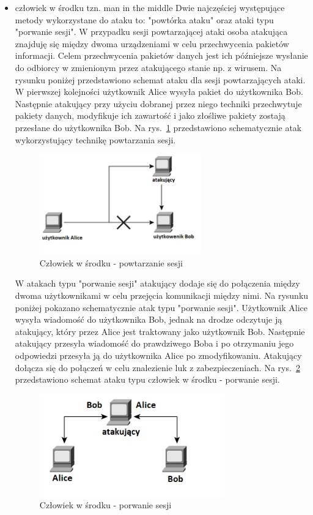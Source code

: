 \documentclass[12p]{article}
\begin{document}
\begin{itemize}
\item człowiek w środku tzn. man in the middle
\newline Dwie najczęściej występujące metody wykorzystane do ataku to: "powtórka ataku" oraz ataki typu "porwanie sesji". W przypadku sesji powtarzającej ataki osoba atakująca znajduję się między dwoma urządzeniami w celu przechwycenia pakietów informacji. Celem przechwycenia pakietów danych jest ich późniejsze wysłanie do odbiorcy w zmienionym przez atakującego stanie np. z wirusem. Na rysunku poniżej przedstawiono schemat ataku dla sesji powtarzających ataki. W pierwszej kolejności użytkownik Alice wysyła pakiet do użytkownika Bob. Następnie atakujący przy użyciu dobranej przez niego techniki przechwytuje pakiety danych, modyfikuje ich zawartość i jako złośliwe pakiety zostają przesłane do użytkownika Bob. Na rys.~\ref{Powtarzajace_ataki} przedstawiono schematycznie atak wykorzystujący technikę powtarzania sesji.
\begin{figure}[H]
\centering
\includegraphics[width=7cm]{Powtarzajace_ataki.jpg}
\caption{Człowiek w środku - powtarzanie sesji}\label{Powtarzajace_ataki}
\end{figure}

\quad W atakach typu "porwanie sesji" atakujący dodaje się do połączenia między dwoma użytkownikami w celu przejęcia komunikacji między nimi. Na rysunku poniżej pokazano schematycznie atak typu "porwanie sesji". Użytkownik Alice wysyła wiadomość do użytkownika Bob, jednak na drodze odczytuje ją atakujący, który przez Alice jest traktowany jako użytkownik Bob. Następnie atakujący przesyła wiadomość do prawdziwego Boba i po otrzymaniu jego odpowiedzi przesyła ją do użytkownika Alice po zmodyfikowaniu. Atakujący dołącza się do połączeń w celu znalezienie luk z zabezpieczeniach. Na rys.~\ref{Porwanie_sesji} przedstawiono schemat ataku typu człowiek w środku - porwanie sesji.
\begin{figure}[H]
\centering
\includegraphics[width=8cm]{Porwanie_sesji.jpg}
\caption{Człowiek w środku - porwanie sesji}\label{Porwanie_sesji}
\end{figure}


\end{itemize}
\end{document}
